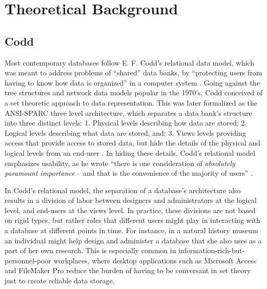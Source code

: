\section{Theoretical Background}
\subsection{Codd}
Most contemporary databases follow E. F. Codd's relational data model, which was meant to address problems of “shared” data banks, by  “protecting users from having to know how data is organized” in a computer system  \cite[p. 377]{Codd_1970}. Going against the tree structures and network data models popular in the 1970's, Codd conceived of a set theoretic approach to data representation. This was later formalized as the ANSI-SPARC three level architecture, which separates a data bank's structure into three distinct levels: 1. Physical levels describing how data are stored; 2. Logical levels describing what data are stored, and; 3. Views levels providing access that provide access to stored data, but hide the details of the physical and logical levels from an end-user \cite{tsichritzis1978ansi}. In hiding these details, Codd's relational model emphasizes usability, as he wrote “there is one consideration of \emph{absolutely paramount importance} – and that is the convenience of the majority of users” \cite[p.2]{Codd_1971}.

In Codd's relational model, the separation of a database's architecture also results in a division of labor between designers and administrators at the logical level, and end-users at the views level. In practice, these divisions are not based on rigid types, but rather roles that different users might play in interacting with a database at different points in time. For instance, in a natural history museum an individual might help design and administer a database that she also uses as a part of her own research. This is especially common in information-rich-but-personnel-poor workplaces, where desktop applications such as Microsoft Access and FileMaker Pro reduce the burden of having to be conversant in set theory just to create reliable data storage. 

